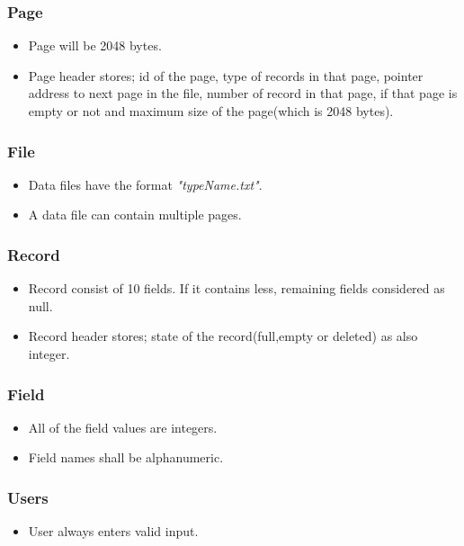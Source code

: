 \documentclass{article}
\begin{document}
        \subsubsection{Page}
             \begin{itemize}
                \item Page will be 2048 bytes.
                \item Page header stores; id of the page, type of records in that page, pointer address to next page in the file, number of record in that page, if that page is empty or not and maximum size of the page(which is 2048 bytes).
            \end{itemize}
        \subsubsection{File}
            \begin{itemize}
                \item Data files have the format \emph{"typeName.txt"}.
                \item A data file can contain multiple pages.
            \end{itemize}
        \subsubsection{Record}
            \begin{itemize}
                \item Record consist of 10 fields. If it contains less, remaining fields considered as null.
                \item Record header stores; state of the record(full,empty or deleted) as also integer.
            \end{itemize}
        \subsubsection{Field}
            \begin{itemize}
                \item All of the field values are integers.
                \item Field names shall be alphanumeric.
            \end{itemize}
        \subsubsection{Users}
            \begin{itemize}
                \item User always enters valid input.
            \end{itemize}
\end{document}
